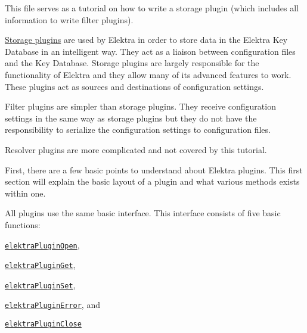 This file serves as a tutorial on how to write a storage plugin (which includes all information to write filter plugins).


\begin{DoxyItemize}
\item \hyperlink{doc_tutorials_storage-plugins_md}{Storage plugins} are used by Elektra in order to store data in the Elektra Key Database in an intelligent way. They act as a liaison between configuration files and the Key Database. Storage plugins are largely responsible for the functionality of Elektra and they allow many of its advanced features to work. These plugins act as sources and destinations of configuration settings.
\item Filter plugins are simpler than storage plugins. They receive configuration settings in the same way as storage plugins but they do not have the responsibility to serialize the configuration settings to configuration files.
\item Resolver plugins are more complicated and not covered by this tutorial.
\end{DoxyItemize}

First, there are a few basic points to understand about Elektra plugins. This first section will explain the basic layout of a plugin and what various methods exists within one.

All plugins use the same basic interface. This interface consists of five basic functions\+:


\begin{DoxyItemize}
\item \href{https://doc.libelektra.org/api/current/html/group__plugin.html#ga23c2eb3584e38a4d494eb8f91e5e3d8d}{\tt {\ttfamily elektra\+Plugin\+Open}},
\item \href{https://doc.libelektra.org/api/current/html/group__plugin.html#gacb69f3441c6d84241b4362f958fbe313}{\tt {\ttfamily elektra\+Plugin\+Get}},
\item \href{https://doc.libelektra.org/api/current/html/group__plugin.html#gae65781a1deb34efc79c8cb9d9174842c}{\tt {\ttfamily elektra\+Plugin\+Set}},
\item \href{https://doc.libelektra.org/api/current/html/group__plugin.html#gad74b35f558ac7c3262f6069c5c47dc79}{\tt {\ttfamily elektra\+Plugin\+Error}}, and
\item \href{https://doc.libelektra.org/api/current/html/group__plugin.html#ga1236aefe5b2baf8b7bf636ba5aa9ea29}{\tt {\ttfamily elektra\+Plugin\+Close}}
\end{DoxyItemize}

